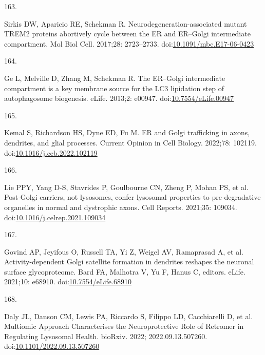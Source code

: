 \documentclass[
  12pt,
  a4paper,
]{book}
\newlength{\cslhangindent}
\newlength{\csllabelwidth}
\newlength{\cslentryspacingunit} %
\newenvironment{CSLReferences}[2] %
 {%
  \setlength{\parindent}{0pt}
  \ifodd #1
  \let\oldpar\par
  \def\par{\hangindent=\cslhangindent\oldpar}
  \fi
  \setlength{\parskip}{#2\cslentryspacingunit}
 }%
 {}
\newcommand{\CSLLeftMargin}[1]{\parbox[t]{\csllabelwidth}{#1}}
\newcommand{\CSLRightInline}[1]{\parbox[t]{\linewidth - \csllabelwidth}{#1}\break}
\begin{document}
\begin{CSLReferences}{0}{0}
\leavevmode{}%
\CSLLeftMargin{163. }%
\CSLRightInline{Sirkis DW, Aparicio RE, Schekman R. Neurodegeneration-associated mutant {TREM2} proteins abortively cycle between the {ER} and {ER}--{Golgi} intermediate compartment. Mol Biol Cell. 2017;28: 2723--2733. doi:\href{https://doi.org/10.1091/mbc.E17-06-0423}{10.1091/mbc.E17-06-0423}}

\leavevmode{}%
\CSLLeftMargin{164. }%
\CSLRightInline{Ge L, Melville D, Zhang M, Schekman R. The {ER}--{Golgi} intermediate compartment is a key membrane source for the {LC3} lipidation step of autophagosome biogenesis. eLife. 2013;2: e00947. doi:\href{https://doi.org/10.7554/eLife.00947}{10.7554/eLife.00947}}

\leavevmode{}%
\CSLLeftMargin{165. }%
\CSLRightInline{Kemal S, Richardson HS, Dyne ED, Fu M. {ER} and {Golgi} trafficking in axons, dendrites, and glial processes. Current Opinion in Cell Biology. 2022;78: 102119. doi:\href{https://doi.org/10.1016/j.ceb.2022.102119}{10.1016/j.ceb.2022.102119}}

\leavevmode{}%
\CSLLeftMargin{166. }%
\CSLRightInline{Lie PPY, Yang D-S, Stavrides P, Goulbourne CN, Zheng P, Mohan PS, et al. Post-{Golgi} carriers, not lysosomes, confer lysosomal properties to pre-degradative organelles in normal and dystrophic axons. Cell Reports. 2021;35: 109034. doi:\href{https://doi.org/10.1016/j.celrep.2021.109034}{10.1016/j.celrep.2021.109034}}

\leavevmode{}%
\CSLLeftMargin{167. }%
\CSLRightInline{Govind AP, Jeyifous O, Russell TA, Yi Z, Weigel AV, Ramaprasad A, et al. Activity-dependent {Golgi} satellite formation in dendrites reshapes the neuronal surface glycoproteome. Bard FA, Malhotra V, Yu F, Hanus C, editors. eLife. 2021;10: e68910. doi:\href{https://doi.org/10.7554/eLife.68910}{10.7554/eLife.68910}}

\leavevmode{}%
\CSLLeftMargin{168. }%
\CSLRightInline{Daly JL, Danson CM, Lewis PA, Riccardo S, Filippo LD, Cacchiarelli D, et al. Multiomic {Approach Characterises} the {Neuroprotective Role} of {Retromer} in {Regulating Lysosomal Health}. bioRxiv. 2022; 2022.09.13.507260. doi:\href{https://doi.org/10.1101/2022.09.13.507260}{10.1101/2022.09.13.507260}}


\end{CSLReferences}
\end{document}
